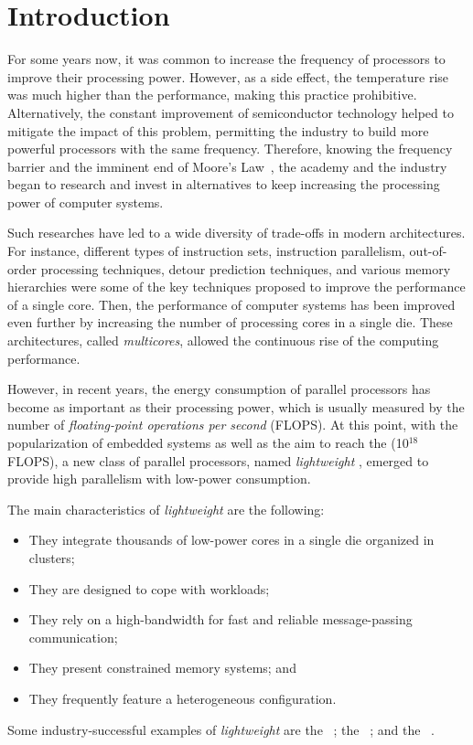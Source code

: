 \chapter{Introduction}
\label{ch.intro}

    For some years now, it was common to increase the frequency of processors to improve their processing power.
    However, as a side effect, the temperature rise was much higher than the performance, making this practice prohibitive.
    Alternatively, the constant improvement of semiconductor technology helped to mitigate the impact of this problem, permitting the industry to build more powerful processors with the same frequency.
    Therefore, knowing the frequency barrier and the imminent end of Moore's Law~\cite{moore:1965}, the academy and the industry began to research and invest in alternatives to keep increasing the processing power of computer systems.

    Such researches have led to a wide diversity of trade-offs in modern architectures.
    For instance, different types of instruction sets, instruction parallelism, out-of-order processing techniques, detour prediction techniques, and various memory hierarchies were some of the key techniques proposed to improve the performance of a single core.
    Then, the performance of computer systems has been improved even further by increasing the number of processing cores in a single die.
    These architectures, called \textit{multicores}, allowed the continuous rise of the computing performance.

    However, in recent years, the energy consumption of parallel processors has become as important as their processing power, which is usually measured by the number of \textit{floating-point operations per second} (FLOPS).
    At this point, with the popularization of embedded systems as well as the aim to reach the \exascale (10$^{18}$ FLOPS), a new class of parallel processors, named \textit{lightweight} \manycores, emerged to provide high parallelism with low-power consumption.
    
    The main characteristics of  \textit{lightweight} \manycores are the following:
    \begin{itemize}
        \item They integrate thousands of low-power cores in a single die organized in clusters;
        \item They are designed to cope with \mimd workloads;
        \item They rely on a high-bandwidth \noc for fast and reliable message-passing communication;
        \item They present constrained memory systems; and
        \item They frequently feature a heterogeneous configuration.
    \end{itemize}
    Some industry-successful examples of \textit{lightweight} \manycores are
    the \mppa~\cite{DeDinechin2013-1};
    the \epiphany~\cite{olofsson2014}; and
    the \taihulight~\cite{zheng2015}.

